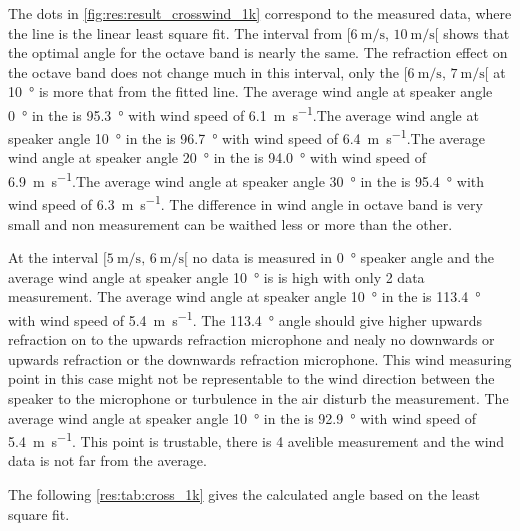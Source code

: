  The dots in \autoref{fig:res:result_crosswind_1k} correspond to the measured data, where the line is the linear least square fit. The interval from $[\SI{6}{\meter\per\second},\, \SI{10}{\meter\per\second}[ $ shows that the optimal angle for the  octave band is nearly the same. The refraction effect on the   octave band does not change much in this interval, only the $[\SI{6}{\meter\per\second},\, \SI{7}{\meter\per\second}[ $ at \SI{10}{\degree} is more that  from the fitted line. The average wind angle at speaker angle \SI{0}{\degree} in the  is \SI{95.3}{\degree} with wind speed of \SI{6.1}{\meter\per\second}.The average wind angle at speaker angle \SI{10}{\degree} in the  is \SI{96.7}{\degree} with wind speed of \SI{6.4}{\meter\per\second}.The average wind angle at speaker angle \SI{20}{\degree} in the  is \SI{94.0}{\degree} with wind speed of \SI{6.9}{\meter\per\second}.The average wind angle at speaker angle \SI{30}{\degree} in the  is \SI{95.4}{\degree} with wind speed of \SI{6.3}{\meter\per\second}. The difference in wind angle in   octave band is very small and non measurement can be waithed less or more than the other. 

At the interval $[\SI{5}{\meter\per\second},\, \SI{6}{\meter\per\second}[ $ no data is measured in \SI{0}{\degree} speaker angle and the average wind angle at speaker angle \SI{10}{\degree} is is high with only 2 data measurement. The average wind angle at speaker angle \SI{10}{\degree} in the  is \SI{113.4}{\degree} with wind speed of \SI{5.4}{\meter\per\second}. The \SI{113.4}{\degree} angle should give higher upwards refraction on to the upwards refraction microphone and nealy no downwards or upwards refraction or the downwards refraction microphone. This wind measuring point in this case might not be representable to the wind direction between the speaker to the microphone or turbulence in the air disturb the measurement. The average wind angle at speaker angle \SI{10}{\degree} in the  is \SI{92.9}{\degree} with wind speed of \SI{5.4}{\meter\per\second}. This point is trustable, there is 4 avelible measurement and the wind data is not far from the average.
 
 The following \autoref{res:tab:cross_1k} gives the calculated angle based on the least square fit.
 
